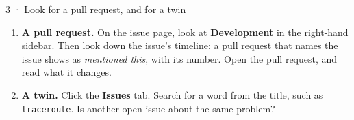 \documentclass{handout}
\begin{document}
\begin{frame}{3 · Look for a pull request, and for a twin}
  \begin{enumerate}
    \item \textbf{A pull request.} On the issue page, look at
      \textbf{Development} in the right-hand sidebar. Then look down the
      issue's timeline: a pull request that names the issue shows as
      \textit{mentioned this}, with its number. Open the pull request, and
      read what it changes.
    \item \textbf{A twin.} Click the \textbf{Issues} tab. Search for a word
      from the title, such as \texttt{traceroute}. Is another open issue
      about the same problem?
  \end{enumerate}
\end{frame}
\end{document}
